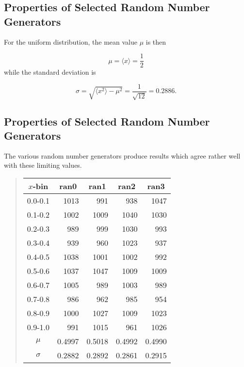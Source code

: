 \documentclass[%
oneside,                 %
final,                   %
10pt]{article}
\newenvironment{block_mdfboxadmon}[1][]{
\begin{block_mdfboxmdframed}[frametitle=#1]
}
{
\end{block_mdfboxmdframed}
}
\begin{document}
\subsection{Properties of Selected Random Number Generators}

\begin{block_mdfboxadmon}[]
For the uniform distribution, the mean value $\mu$ is then

\begin{equation*}
  \mu=\langle x\rangle=\frac{1}{2}
\end{equation*}
while the standard deviation is

\begin{equation*}
   \sigma=\sqrt{\langle x^2\rangle-\mu^2}=\frac{1}{\sqrt{12}}=0.2886.
\end{equation*}
\end{block_mdfboxadmon} %



\subsection{Properties of Selected Random Number Generators}

\begin{block_mdfboxadmon}[]
The various random number generators produce results which agree rather well with
these limiting values. 


\begin{quote}
\begin{tabular}{crrrr}
\hline
\multicolumn{1}{c}{ $x$-bin } & \multicolumn{1}{c}{ ran0 } & \multicolumn{1}{c}{ ran1 } & \multicolumn{1}{c}{ ran2 } & \multicolumn{1}{c}{ ran3 } \\
\hline
0.0-0.1  & 1013   & 991    & 938    & 1047   \\
0.1-0.2  & 1002   & 1009   & 1040   & 1030   \\
0.2-0.3  & 989    & 999    & 1030   & 993    \\
0.3-0.4  & 939    & 960    & 1023   & 937    \\
0.4-0.5  & 1038   & 1001   & 1002   & 992    \\
0.5-0.6  & 1037   & 1047   & 1009   & 1009   \\
0.6-0.7  & 1005   & 989    & 1003   & 989    \\
0.7-0.8  & 986    & 962    & 985    & 954    \\
0.8-0.9  & 1000   & 1027   & 1009   & 1023   \\
0.9-1.0  & 991    & 1015   & 961    & 1026   \\
$\mu$    & 0.4997 & 0.5018 & 0.4992 & 0.4990 \\
$\sigma$ & 0.2882 & 0.2892 & 0.2861 & 0.2915 \\
\hline
\end{tabular}
\end{quote}

\noindent
\end{block_mdfboxadmon} %
\end{document}
